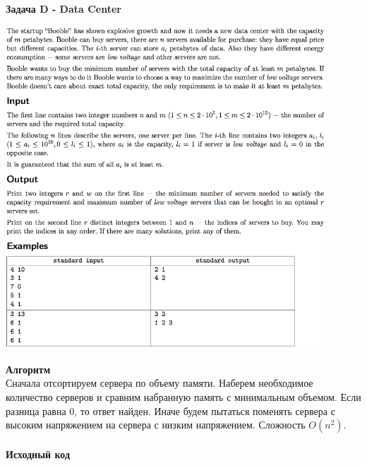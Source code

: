 \documentclass[a4paper,12pt]{article}
\begin{document}
\textbf{{\large Задача D - Data Center}} \\
\begin{center}
\includegraphics[width=0.9\textwidth]{CT_ACM_WEST/CT_ACM_WEST_D.png}\\ [1cm]
\end{center}
\textbf{{\large Алгоритм}} \\
Сначала отсортируем сервера по объему памяти. Наберем необходимое количество серверов и сравним набранную память с минимальным объемом. Если разница равна $0$, то ответ найден. Иначе будем пытаться поменять сервера с высоким напряжением на сервера с низким напряжением. Сложность $O(n^2)$.\\ 
\\
\newpage
\textbf{{\large Исходный код}}
\end{document}
